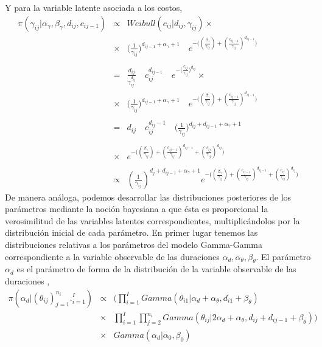 Y para la variable latente asociada a los costos,
\begin{eqnarray*}
\pi(\gamma_{ij}|\alpha_\gamma,\beta_\gamma,d_{ij},c_{ij-1})&\propto& Weibull(c_{ij}|d_{ij},\gamma_{ij})\times\\
&\times& \bigg(\frac{1}{\gamma_{ij}}\bigg)^{d_{ij-1} +\alpha_\gamma+1} \quad e^{-\big((\frac{\beta_\gamma}{\gamma_{ij}})+(\frac{c_{ij-1}}{\gamma_{ij}})^{d_{ij-1}}\big)}\\
\\
&=&\frac{d_{ij}}{\gamma_{ij}^{d_{ij}}}\quad c_{ij}^{d_{ij-1}}\quad e^{-\big(\frac{c_{ij}}{\gamma_{ij}}\big)^{d_{ij}}}\times\\
&\times& \bigg(\frac{1}{\gamma_{ij}}\bigg)^{d_{ij-1} +\alpha_\gamma+1} \quad e^{-\big((\frac{\beta_\gamma}{\gamma_{ij}})+(\frac{c_{ij-1}}{\gamma_{ij}})^{d_{ij-1}}\big)}\\
\\
&=&d_{ij}\quad c_{ij}^{d_{ij}-1}\quad\bigg(\frac{1}{\gamma_{ij}}\bigg)^{d_{ij}+d_{ij-1}+\alpha_\gamma+1}\\
\\
&\times& e^{-\big((\frac{\beta_\gamma}{\gamma_{ij}})+(\frac{c_{ij-1}}{\gamma_{ij}})^{d_{ij-1}}+(\frac{c_{ij}}{\gamma_{ij}})^{d_{ij}}\big)}\\
\\
&\propto&\left(\frac{1}{\gamma_{ij}}\right)^{d_j+d_{ij-1}+\alpha_\gamma+1}e^{-\big((\frac{\beta_\gamma}{\gamma_{ij}})+(\frac{c_{ij-1}}{\gamma_{ij}})^{d_{ij-1}}+(\frac{c_{ij}}{\gamma_{ij}})^{d_{ij}}\big)}
\end{eqnarray*}
De manera an\'aloga, podemos desarrollar las distribuciones posteriores de los par\'ametros mediante la noci\'on bayesiana a que \'esta es proporcional la verosimilitud de las variables latentes correspondientes, multiplic\'andolos por la distribuci\'on inicial de cada par\'ametro. En primer lugar tenemos las distribuciones relativas a los par\'ametros del modelo Gamma-Gamma correspondiente a la variable observable de las duraciones $\alpha_d, \alpha_\theta, \beta_\theta$. El par\'ametro $\alpha_d$ es el par\'ametro de forma de la distribuci\'on de la variable observable de las duraciones ,\\
\begin{eqnarray*}
\pi(\alpha_d|(\theta_{ij})_{j=1}^{n_i}._{i=1}^I) &\propto& \Big(\prod_{i=1}^I Gamma(\theta_{i1}|\alpha_d+\alpha_\theta, d_{i1}+\beta_\theta) \\
&\times& \prod_{i=1}^I \prod_{j=2}^{n_i} Gamma(\theta_{ij}|2\alpha_d+\alpha_\theta, d_{ij}+d_{ij-1}+\beta_\theta) \Big) \\
&\times& Gamma(\alpha_d|\alpha_0,\beta_0)\\
\end{eqnarray*}
